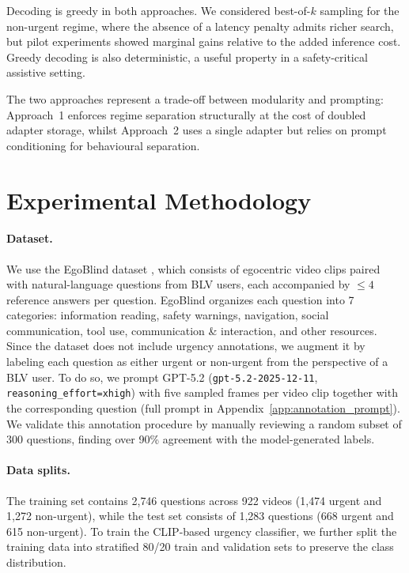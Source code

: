 \documentclass{article}
\begin{document}
Decoding is greedy in both approaches. We considered best-of-$k$ sampling for the non-urgent regime, where the absence of a latency penalty admits richer search, but pilot experiments showed marginal gains relative to the added inference cost. Greedy decoding is also deterministic, a useful property in a safety-critical assistive setting.

The two approaches represent a trade-off between modularity and prompting: Approach~1 enforces regime separation structurally at the cost of doubled adapter storage, whilst Approach~2 uses a single adapter but relies on prompt conditioning for behavioural separation.


\section{Experimental Methodology}\label{sec:experiments}
\paragraph{Dataset.} We use the EgoBlind dataset \cite{xiao2025egoblind}, which consists of egocentric video clips paired with natural-language questions from BLV users, each accompanied by $\leq 4$ reference answers per question. EgoBlind organizes each question into 7 categories: information reading, safety warnings, navigation, social communication, tool use, communication \& interaction, and other resources. Since the dataset does not include urgency annotations, we augment it by labeling each question as either urgent or non-urgent from the perspective of a BLV user. To do so, we prompt GPT-5.2 (\texttt{gpt-5.2-2025-12-11}, \texttt{reasoning\_effort=xhigh}) with five sampled frames per video clip together with the corresponding question (full prompt in Appendix~\ref{app:annotation_prompt}). We validate this annotation procedure by manually reviewing a random subset of 300 questions, finding over 90\% agreement with the model-generated labels.

\paragraph{Data splits.}
The training set contains 2{,}746 questions across 922 videos (1{,}474 urgent and 1{,}272 non-urgent), while the test set consists of 1{,}283 questions (668 urgent and 615 non-urgent). To train the CLIP-based urgency classifier, we further split the training data into stratified 80/20 train and validation sets to preserve the class distribution.
\end{document}
